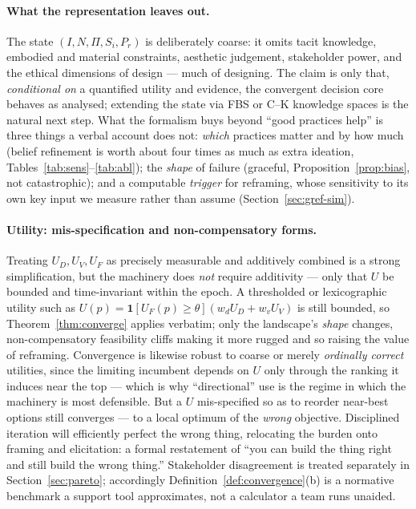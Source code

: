 \documentclass[11pt]{article}
\begin{document}
\paragraph{What the representation leaves out.} The state $(I,N,\Pi,S_i,P_r)$ is deliberately coarse: it omits tacit knowledge, embodied and material constraints, aesthetic judgement, stakeholder power, and the ethical dimensions of design --- much of designing. The claim is only that, \emph{conditional on} a quantified utility and evidence, the convergent decision core behaves as analysed; extending the state via FBS \citep{gero2004} or C--K knowledge spaces \citep{hatchuel2009} is the natural next step. What the formalism buys beyond ``good practices help'' is three things a verbal account does not: \emph{which} practices matter and by how much (belief refinement is worth about four times as much as extra ideation, Tables~\ref{tab:sens}--\ref{tab:abl}); the \emph{shape} of failure (graceful, Proposition~\ref{prop:bias}, not catastrophic); and a computable \emph{trigger} for reframing, whose sensitivity to its own key input we measure rather than assume (Section~\ref{sec:gref-sim}).

\paragraph{Utility: mis-specification and non-compensatory forms.} Treating $U_D,U_V,U_F$ as precisely measurable and additively combined is a strong simplification, but the machinery does \emph{not} require additivity --- only that $U$ be bounded and time-invariant within the epoch. A thresholded or lexicographic utility such as $U(p)=\mathbf 1[U_F(p)\ge\theta](w_dU_D+w_vU_V)$ is still bounded, so Theorem~\ref{thm:converge} applies verbatim; only the landscape's \emph{shape} changes, non-compensatory feasibility cliffs making it more rugged and so raising the value of reframing. Convergence is likewise robust to coarse or merely \emph{ordinally correct} utilities, since the limiting incumbent depends on $U$ only through the ranking it induces near the top --- which is why ``directional'' use is the regime in which the machinery is most defensible. But a $U$ mis-specified so as to reorder near-best options still converges --- to a local optimum of the \emph{wrong} objective. Disciplined iteration will efficiently perfect the wrong thing, relocating the burden onto framing and elicitation: a formal restatement of ``you can build the thing right and still build the wrong thing.'' Stakeholder disagreement is treated separately in Section~\ref{sec:pareto}; accordingly Definition~\ref{def:convergence}(b) is a normative benchmark a support tool approximates, not a calculator a team runs unaided.
\end{document}
